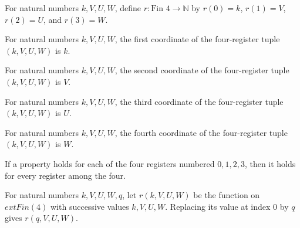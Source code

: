 \begin{definition}
\label{BoolCircuit.AdjWalk.rg}
\leanok
For natural numbers $k,V,U,W$, define $r:\text{Fin }4\to\mathbb{N}$ by $r(0)=k$, $r(1)=V$,
$r(2)=U$, and $r(3)=W$.
\end{definition}

\begin{lemma}
\label{BoolCircuit.AdjWalk.rg_0}
\leanok
{}
For natural numbers $k,V,U,W$, the first coordinate of the four-register tuple
$(k,V,U,W)$ is $k$.
\end{lemma}

\begin{lemma}
\label{BoolCircuit.AdjWalk.rg_1}
\leanok
{}
For natural numbers $k,V,U,W$, the second coordinate of the four-register tuple
$(k,V,U,W)$ is $V$.
\end{lemma}

\begin{lemma}
\label{BoolCircuit.AdjWalk.rg_2}
\leanok
{}
For natural numbers $k,V,U,W$, the third coordinate of the four-register tuple
$(k,V,U,W)$ is $U$.
\end{lemma}

\begin{lemma}
\label{BoolCircuit.AdjWalk.rg_3}
\leanok
{}
For natural numbers $k,V,U,W$, the fourth coordinate of the four-register tuple
$(k,V,U,W)$ is $W$.
\end{lemma}

\begin{lemma}
\label{BoolCircuit.AdjWalk.fin4_cases}
\leanok
{}
If a property holds for each of the four registers numbered $0,1,2,3$, then it holds for
every register among the four.
\end{lemma}

\begin{lemma}
\label{BoolCircuit.AdjWalk.upd_0}
\leanok
{}
For natural numbers $k,V,U,W,q$, let $r(k,V,U,W)$ be the function on $	ext{Fin}(4)$ with
successive values $k,V,U,W$. Replacing its value at index $0$ by $q$ gives $r(q,V,U,W)$.
\end{lemma}

